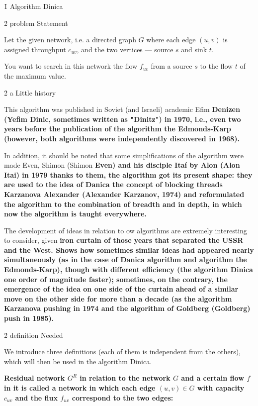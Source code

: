 \h1{ Algorithm Dinica }



\h2{ problem Statement }

Let the given network, i.e. a directed graph $G$ where each edge $(u,v)$ is assigned throughput $c_{uv}$, and the two vertices --- source $s$ and sink $t$.

You want to search in this network the flow $f_{uv}$ from a source $s$ to the flow $t$ of the maximum value.



\h2{ a Little history }

This algorithm was published in Soviet (and Israeli) academic Efim \bf{Denizen} (Yefim Dinic, sometimes written as "Dinitz") in 1970, i.e., even two years before the publication of the algorithm the Edmonds-Karp (however, both algorithms were independently discovered in 1968).

In addition, it should be noted that some simplifications of the algorithm were made Even, Shimon (Shimon \bf{Even}) and his disciple Itaí by Alon (Alon \bf{Itai}) in 1979 thanks to them, the algorithm got its present shape: they are used to the idea of Danica the concept of blocking threads Karzanova Alexander (Alexander Karzanov, 1974) and reformulated the algorithm to the combination of breadth and in depth, in which now the algorithm is taught everywhere.

The development of ideas in relation to ow algorithms are extremely interesting to consider, given \bf {iron curtain} of those years that separated the USSR and the West. Shows how sometimes similar ideas had appeared nearly simultaneously (as in the case of Danica algorithm and algorithm the Edmonds-Karp), though with different efficiency (the algorithm Dinica one order of magnitude faster); sometimes, on the contrary, the emergence of the idea on one side of the curtain ahead of a similar move on the other side for more than a decade (as the algorithm Karzanova pushing in 1974 and the algorithm of Goldberg (Goldberg) push in 1985).



\h2{ definition Needed }

We introduce three definitions (each of them is independent from the others), which will then be used in the algorithm Dinica.

\bf{Residual network $G^R$} in relation to the network $G$ and a certain flow $f$ in it is called a network in which each edge $(u,v) \in G$ with capacity $c_{uv}$ and the flux $f_{uv}$ correspond to the two edges:

